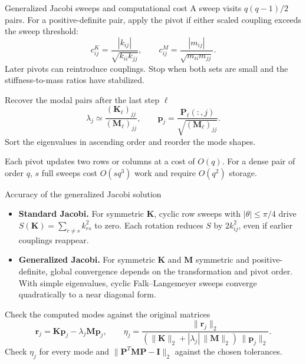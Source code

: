 \documentclass[aspectratio=169]{beamer}
\begin{document}
\begin{frame}{Generalized Jacobi sweeps and computational cost}
  \small
  A sweep visits $q(q-1)/2$ pairs. For a positive-definite pair, apply
  the pivot if either scaled coupling exceeds the sweep threshold:
  \[
    c^K_{ij}=\frac{|k_{ij}|}{\sqrt{k_{ii}k_{jj}}},\qquad
    c^M_{ij}=\frac{|m_{ij}|}{\sqrt{m_{ii}m_{jj}}}.
  \]
  Later pivots can reintroduce couplings. Stop when both sets are small
  and the stiffness-to-mass ratios have stabilized.
  \begin{block}{\small Recover the modal pairs after the last step $\ell$}
    \[
      \lambda_j\simeq\frac{(\mathbf K_\ell)_{jj}}{(\mathbf M_\ell)_{jj}},\qquad
      \mathbf p_j=\frac{\mathbf P_\ell(:,j)}{\sqrt{(\mathbf M_\ell)_{jj}}}.
    \]
    Sort the eigenvalues in ascending order and reorder the mode shapes.
  \end{block}
  Each pivot updates two rows or columns at a cost of $O(q)$.
  For a dense pair of order $q$, $s$ full sweeps cost $O(sq^3)$ work
  and require $O(q^2)$ storage.
\end{frame}

\begin{frame}{Accuracy of the generalized Jacobi solution}
  \small
  \begin{itemize}
    \item \textbf{Standard Jacobi.} For symmetric $\mathbf K$, cyclic row sweeps with
          $|\theta|\leq\pi/4$ drive $S(\mathbf K)=\sum_{r\ne s}k_{rs}^2$ to zero.
          Each rotation reduces $S$ by $2k_{ij}^2$, even if earlier couplings reappear.
    \item \textbf{Generalized Jacobi.} For symmetric $\mathbf K$ and $\mathbf M$ symmetric and positive-definite, global convergence depends on the transformation and pivot order.
          With simple eigenvalues, cyclic Falk--Langemeyer sweeps converge
          quadratically to a near diagonal form.
  \end{itemize}
  \begin{block}{\small Check the computed modes against the original matrices}
    \[
      \mathbf r_j=\mathbf K\mathbf p_j-\lambda_j\mathbf M\mathbf p_j,\qquad
      \eta_j=\frac{\|\mathbf r_j\|_2}
      {(\|\mathbf K\|_2+|\lambda_j|\,\|\mathbf M\|_2)\,\|\mathbf p_j\|_2}.
    \]
    Check $\eta_j$ for every mode and $\|\mathbf P^T\mathbf M\mathbf P-\mathbf I\|_2$
    against the chosen tolerances.
  \end{block}
\end{frame}
\end{document}
